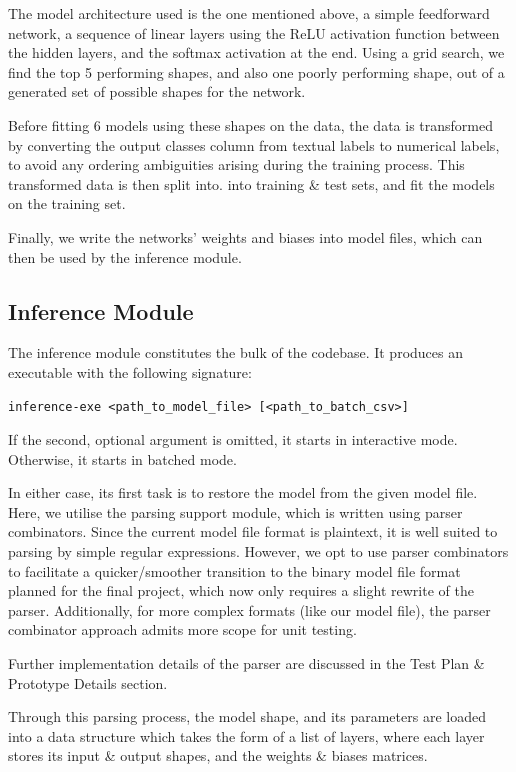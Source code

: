 \documentclass[12pt, titlepage]{article}
\begin{document}
The model architecture used is the one mentioned above, a simple feedforward network, a sequence of linear layers using the ReLU activation function between the hidden layers, and the softmax activation at the end. Using a grid search, we find the top 5 performing shapes, and also one poorly performing shape, out of a generated set of possible shapes for the network.\bigskip

Before fitting 6 models using these shapes on the data, the data is transformed by converting the output classes column from textual labels to numerical labels, to avoid any ordering ambiguities arising during the training process. This transformed data is then split into. into training \& test sets, and fit the models on the training set.\bigskip

Finally, we write the networks' weights and biases into model files, which can then be used by the inference module.

\subsection{Inference Module}
The inference module constitutes the bulk of the codebase. It produces an executable with the following signature:
\begin{verbatim}
inference-exe <path_to_model_file> [<path_to_batch_csv>]
\end{verbatim}
If the second, optional argument is omitted, it starts in interactive mode. Otherwise, it starts in batched mode.\bigskip

In either case, its first task is to restore the model from the given model file. Here, we utilise the parsing support module, which is written using parser combinators. Since the current model file format is plaintext, it is well suited to parsing by simple regular expressions. However, we opt to use parser combinators to facilitate a quicker/smoother transition to the binary model file format planned for the final project, which now only requires a slight rewrite of the parser. Additionally, for more complex formats (like our model file), the parser combinator approach admits more scope for unit testing. 

Further implementation details of the parser are discussed in the Test Plan \& Prototype Details section. \bigskip

Through this parsing process, the model shape, and its parameters are loaded into a data structure which takes the form of a list of layers, where each layer stores its input \& output shapes, and the weights \& biases matrices.\bigskip
\end{document}
